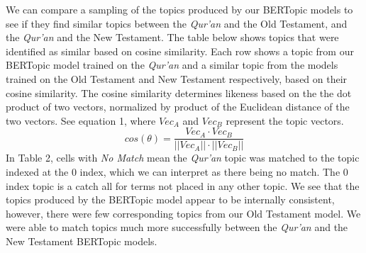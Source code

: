 \documentclass{article}
\begin{document}
    We can compare a sampling of the topics produced by our BERTopic models to see if they find similar topics between the \textit{Qur'an} and the Old Testament, and the \textit{Qur'an} and the New Testament. The table below shows topics that were identified as similar based on cosine similarity. Each row shows a topic from our BERTopic model trained on the \textit{Qur'an} and a similar topic from the models trained on the Old Testament and New Testament respectively, based on their cosine similarity. The cosine similarity determines likeness based on the the dot product of two vectors, normalized by product of the Euclidean distance of the two vectors. See equation 1, where $Vec_A$ and $Vec_B$ represent the topic vectors.
    \begin{equation}
        cos(\theta) = \frac{Vec_A \cdot Vec_B}{||Vec_A|| \cdot ||Vec_B||}
    \end{equation}
    In Table 2, cells with \textit{No Match} mean the \textit{Qur'an} topic was matched to the topic indexed at the 0 index, which we can interpret as there being no match. The 0 index topic is a catch all for terms not placed in any other topic. We see that the topics produced by the BERTopic model appear to be internally consistent, however, there were few corresponding topics from our Old Testament model. We were able to match topics much more successfully between the \textit{Qur'an} and the New Testament BERTopic models.\\
    
\end{document}
